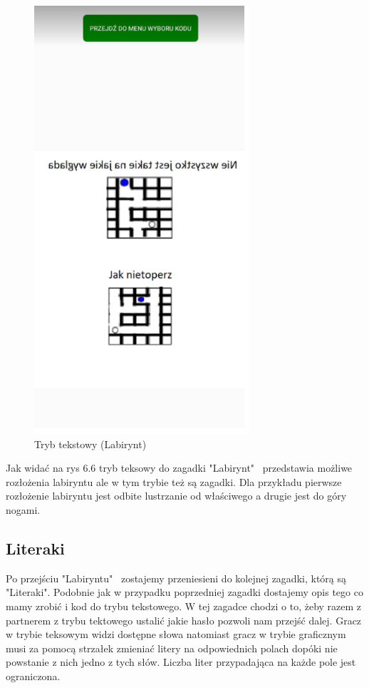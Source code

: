 	\begin{figure}[!htb]
	\begin{center}
		\includegraphics[width=8cm]{rys/tekstowy1.png}
		\caption{Tryb tekstowy (Labirynt)}
		\label{rys:rysunek001}
	\end{center}
\end{figure}
\hspace{-0.60cm}Jak widać na rys 6.6 tryb teksowy do zagadki "Labirynt"~ przedstawia możliwe rozłożenia labiryntu ale w tym trybie też są zagadki. Dla przykładu pierwsze rozłożenie labiryntu jest odbite lustrzanie od właściwego a drugie jest do góry nogami.
\subsection{Literaki}
Po przejściu "Labiryntu"~ zostajemy przeniesieni do kolejnej zagadki, którą są "Literaki". Podobnie jak w przypadku poprzedniej zagadki dostajemy opis tego co mamy zrobić i kod do trybu tekstowego. W tej zagadce chodzi o to, żeby razem z partnerem z trybu tektowego ustalić jakie hasło pozwoli nam przejść dalej. Gracz w trybie teksowym widzi dostępne słowa natomiast gracz w trybie graficznym musi za pomocą strzałek zmieniać litery na odpowiednich polach dopóki nie powstanie z nich jedno z tych słów. Liczba liter przypadająca na każde pole jest ograniczona.

